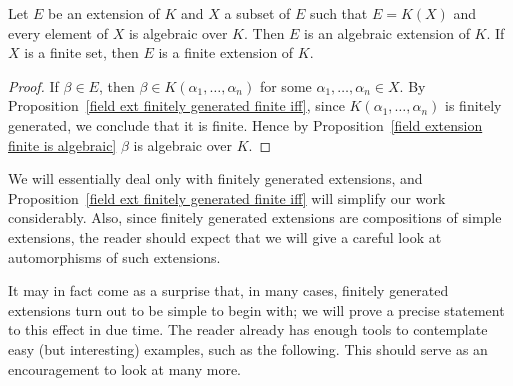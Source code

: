 \begin{theorem}\label{field ext by algebraic elements is algebraic}
Let $E$ be an extension of $K$ and $X$ a subset of $E$ such that $E=K(X)$ and every element of $X$ is algebraic over $K$. Then $E$ is an algebraic extension of $K$. If $X$ is a finite set, then $E$ is a finite extension of $K$.
\end{theorem}
\begin{proof}
If $\beta\in E$, then $\beta\in K(\alpha_1,\dots,\alpha_n)$ for some $\alpha_1,\dots,\alpha_n\in X$. By Proposition~\ref{field ext finitely generated finite iff}, since $K(\alpha_1,\dots,\alpha_n)$ is finitely generated, we conclude that it is finite. Hence by Proposition~\ref{field extension finite is algebraic} $\beta$ is algebraic over $K$.
\end{proof}
We will essentially deal only with finitely generated extensions, and Proposition~\ref{field ext finitely generated finite iff} will simplify our work considerably. Also, since finitely generated extensions are compositions of simple extensions, the reader should expect that we will
give a careful look at automorphisms of such extensions.\par
It may in fact come as a surprise that, in many cases, finitely generated extensions turn out to be simple to begin with; we will prove a precise statement to this effect in due time. The reader already has enough tools to contemplate easy (but interesting) examples, such as the following. This should serve as an encouragement to look at many more.
